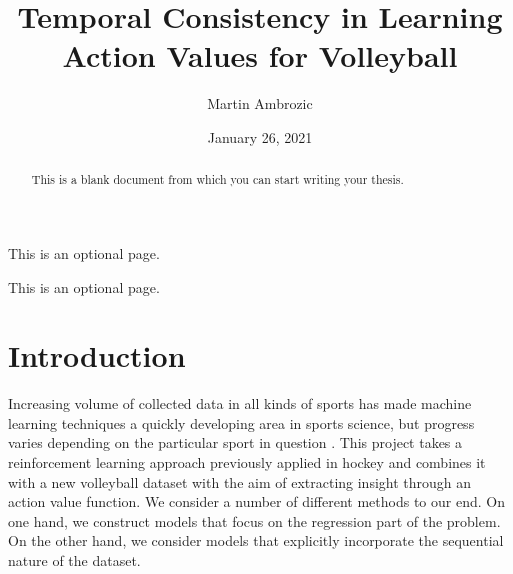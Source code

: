\documentclass{sfuthesis}
\title{Temporal Consistency in Learning Action Values for Volleyball}
\author{Martin Ambrozic}
\date{January 26, 2021}
\begin{document}
	
	\frontmatter
	\maketitle{}
	\makecommittee{}
	
	\begin{abstract}
		This is a blank document from which you can start writing your thesis.
	\end{abstract}
	
	
	\begin{dedication}
		This is an optional page.
	\end{dedication}
	
	
	\begin{acknowledgements}
		This is an optional page.
	\end{acknowledgements}
	
	\tableofcontents%
	\clearpage
	
	\listoftables%
	\clearpage
	
	\listoffigures%
	\clearpage
	
	
	
	
	
	
	\mainmatter%
	
	
	\chapter{Introduction}
	
	Increasing volume of collected data in all kinds of sports has made machine learning techniques a quickly developing area in sports science, but progress varies depending on the particular sport in question \cite{claudino2019current}. This project takes a reinforcement learning approach previously applied in hockey \cite{liu2018deep, routley2015markov,schulte2017markov} and combines it with a new volleyball dataset with the aim of extracting insight through an action value function. We consider a number of different methods to our end. On one hand, we construct models that focus on the regression part of the problem. On the other hand, we consider models that explicitly incorporate the sequential nature of the dataset.
	
\end{document}

